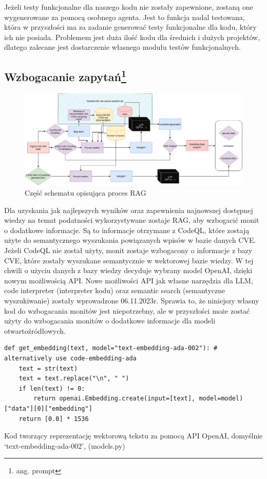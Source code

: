 Jeżeli testy funkcjonalne dla naszego kodu nie zostały zapewnione, zostaną one wygenerowane za pomocą osobnego agenta. 
Jest to funkcja nadal testowana, która w przyszłości ma za zadanie generować testy funkcjonalne dla kodu, który ich nie posiada. 
Problemem jest duża ilość kodu dla średnich i dużych projektów, dlatego zalecane jest dostarczenie własnego modułu testów funkcjonalnych.

\subsection{Wzbogacanie zapytań\footnote{ang. prompt}}
\begin{figure}[h]
    \centering
    \includegraphics[clip, trim=3cm 11cm 3cm 0cm, width=0.9\linewidth]{img/gptester.drawio.png}
    \caption{Część schematu opisująca proces RAG}
    \label{fig:RAG-schemat}
\end{figure}

Dla uzyskania jak najlepszych wyników oraz zapewnienia najnowszej dostępnej wiedzy na temat podatności wykorzystywane zostaje RAG, aby wzbogacić monit o dodatkowe informacje. Są to informacje otrzymane z CodeQL, które zostają użyte do semantycznego wyszukania powiązanych wpisów w bazie danych CVE. 
Jeżeli CodeQL nie został użyty, monit zostaje wzbogacony o informacje z bazy CVE, które zostały wyszukane semantycznie w wektorowej bazie wiedzy. W tej chwili o użyciu danych z bazy wiedzy decyduje wybrany model OpenAI, dzięki nowym możliwością API. 
Nowe możliwości API jak własne narzędzia dla LLM, code interpreter (interpreter kodu) oraz semantic search (semantyczne wyszukiwanie) zostały wprowadzone 06.11.2023r.
Sprawia to, że niniejszy własny kod do wzbogacania monitów jest niepotrzebny, ale w przyszłości może zostać użyty do wzbogacania monitów o dodatkowe informacje dla modeli otwartoźródłowych. 
\begin{listing}
    \begin{verbatim}  
def get_embedding(text, model="text-embedding-ada-002"): # alternatively use code-embedding-ada
    text = str(text)
    text = text.replace("\n", " ")
    if len(text) != 0:
        return openai.Embedding.create(input=[text], model=model)["data"][0]["embedding"]
    return [0.0] * 1536

    \end{verbatim}
    \caption{Kod tworzący reprezentację wektorową tekstu za pomocą API OpenAI, domyślnie `text-embedding-ada-002', (models.py)} 
    \label{listing:vector_embedding}
\end{listing}
    
